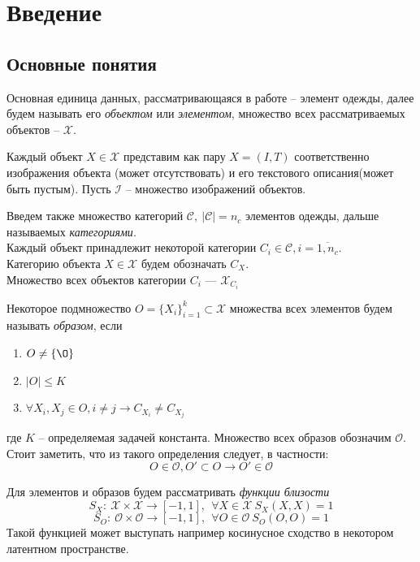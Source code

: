 \documentclass[a4paper,12pt]{article}
\begin{document}
	\section{Введение}
		\subsection{Основные понятия}
			Основная единица данных, рассматривающаяся в работе -- элемент одежды, далее будем называть его \textit{объектом} или \textit{элементом}, множество всех рассматриваемых объектов -- $\mathcal{X}$. 
			
			Каждый объект $X\in\mathcal{X}$ представим как пару $X = (I, T)$ соответственно изображения объекта (может отсутствовать) и его текстового описания(может быть пустым). Пусть $\mathcal{I}$ -- множество изображений объектов.
			
			Введем также множество категорий $\mathcal{C}, ~|\mathcal{C}| = n_c$ элементов одежды, дальше называемых \textit{категориями}. \\
			Каждый объект принадлежит некоторой категории $C_i\in\mathcal{C}, i=\overline{1,n_c}$. \\
			Категорию объекта $X\in\mathcal{X}$ будем обозначать $C_X$. \\
			Множество всех объектов категории $C_i$ --- $\mathcal{X}_{C_i}$
			
			Некоторое подмножество $O = \{X_i\}_{i=1}^k\subset \mathcal{X}$ множества всех элементов будем называть \textit{образом}, если
			\begin{enumerate}
				\item $O\neq\{\O\}$
				\item $|O| \leqslant K$
				\item $\forall X_i, X_j \in O, i\neq j\longrightarrow C_{X_i} \neq C_{X_j}$
			\end{enumerate}
		    где $K$ -- определяемая задачей константа. 
			Множество всех образов обозначим $\mathcal{O}$.
			Стоит заметить, что из такого определения следует, в частности:
		    $$O\in\mathcal{O}, O'\subset O \longrightarrow O'\in\mathcal{O}$$
		    
			Для элементов и образов будем рассматривать \textit{функции близости}
				$$S_X:~\mathcal{X}\times \mathcal{X}\longrightarrow [-1,1], ~~\forall X\in\mathcal{X}~S_X(X,X) = 1$$
				$$S_O:~\mathcal{O}\times \mathcal{O}\longrightarrow [-1,1], ~~\forall O\in\mathcal{O}~S_O(O,O) = 1$$
			Такой функцией может выступать например косинусное сходство в некотором латентном пространстве.
				
\end{document}
